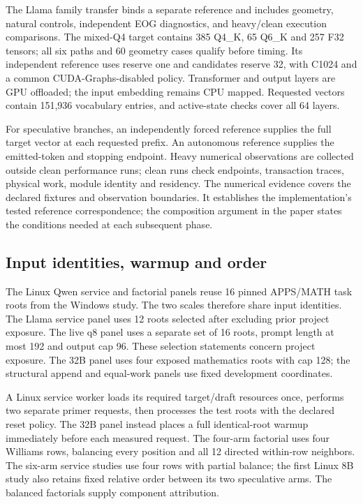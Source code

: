 The Llama family transfer binds a separate reference and includes geometry, natural controls, independent EOG diagnostics, and heavy/clean execution comparisons. The mixed-Q4 target contains 385 Q4\_K, 65 Q6\_K and 257 F32 tensors; all six paths and 60 geometry cases qualify before timing. Its independent reference uses reserve one and candidates reserve 32, with C1024 and a common CUDA-Graphs-disabled policy. Transformer and output layers are GPU offloaded; the input embedding remains CPU mapped. Requested vectors contain 151,936 vocabulary entries, and active-state checks cover all 64 layers.

For speculative branches, an independently forced reference supplies the full target vector at each requested prefix. An autonomous reference supplies the emitted-token and stopping endpoint. Heavy numerical observations are collected outside clean performance runs; clean runs check endpoints, transaction traces, physical work, module identity and residency. The numerical evidence covers the declared fixtures and observation boundaries. It establishes the implementation's tested reference correspondence; the composition argument in the paper states the conditions needed at each subsequent phase.

\subsection{Input identities, warmup and order}
The Linux Qwen service and factorial panels reuse 16 pinned APPS/MATH task roots from the Windows study. The two scales therefore share input identities. The Llama service panel uses 12 roots selected after excluding prior project exposure. The live q8 panel uses a separate set of 16 roots, prompt length at most 192 and output cap 96. These selection statements concern project exposure. The 32B panel uses four exposed mathematics roots with cap 128; the structural append and equal-work panels use fixed development coordinates.

A Linux service worker loads its required target/draft resources once, performs two separate primer requests, then processes the test roots with the declared reset policy. The 32B panel instead places a full identical-root warmup immediately before each measured request. The four-arm factorial uses four Williams rows, balancing every position and all 12 directed within-row neighbors. The six-arm service studies use four rows with partial balance; the first Linux 8B study also retains fixed relative order between its two speculative arms. The balanced factorials supply component attribution.

